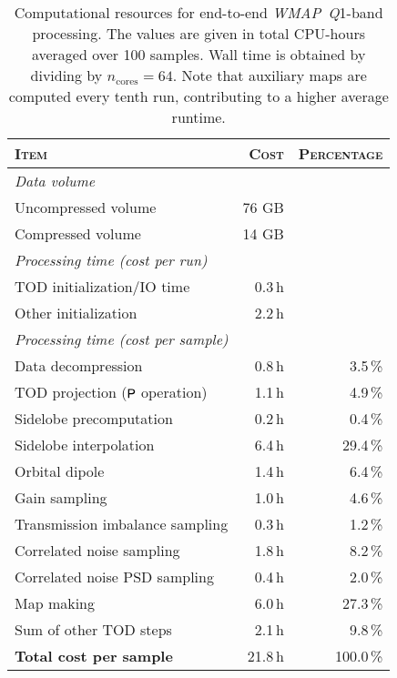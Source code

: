 \documentclass[twocolumn]{aa}
\def\wmap{\emph{WMAP}}
\newcommand{\Q}[0]{\textit Q}
\begin{document}
\begin{table}
	\caption{Computational resources for end-to-end \wmap\ \Q1-band processing. The values are given in total CPU-hours averaged over 100 samples. Wall time is obtained by dividing by $n_\mathrm{cores}=64$. Note that auxiliary maps are computed every tenth run, contributing to a higher average runtime.}
    \label{table:timing}      %
    \centering                                      %
    \begin{tabular}{l r r}
    \hline\hline                        %
    \textsc{Item} & \textsc{Cost} & \textsc{Percentage}\\
    \hline                                             %
    \textit{Data volume}
    \\
    \quad Uncompressed volume & 76 GB &
    \\\vspace*{1mm}
    \quad Compressed volume & 14 GB &
    \\
    \textit{Processing time (cost per run)}
    \\
    \quad TOD initialization/IO time & 0.3\,h &
    \\\vspace*{1mm}
    \quad Other initialization & 2.2\,h &
    \\
    \textit{Processing time (cost per sample)} & 
    \\
    \quad Data decompression & 0.8\,h & 3.5\,\%
    \\
    \quad TOD projection ($\textsf P$ operation) & 1.1\,h & 4.9\,\%
    \\
    \quad Sidelobe precomputation & 0.2\,h & 0.4\,\%
    \\
    \quad Sidelobe interpolation & 6.4\,h & 29.4\,\%
    \\
    \quad Orbital dipole & 1.4\,h & 6.4\,\%
    \\
    \quad Gain sampling & 1.0\,h & 4.6\,\%
    \\
    \quad Transmission imbalance sampling & 0.3\,h & 1.2\,\%
    \\
    \quad Correlated noise sampling & 1.8\,h & 8.2\,\%
    \\
    \quad Correlated noise PSD sampling & 0.4\,h & 2.0\,\%
    \\
    \quad Map making & 6.0\,h &  27.3\,\%
    \\\vspace*{1mm}
    \quad Sum of other TOD steps & 2.1\,h & 9.8\,\%
    \\
    \quad \textbf{Total cost per sample} & 21.8\,h & 100.0\,\%
    \\
    \hline
\end{tabular}
\end{table}
\end{document}
